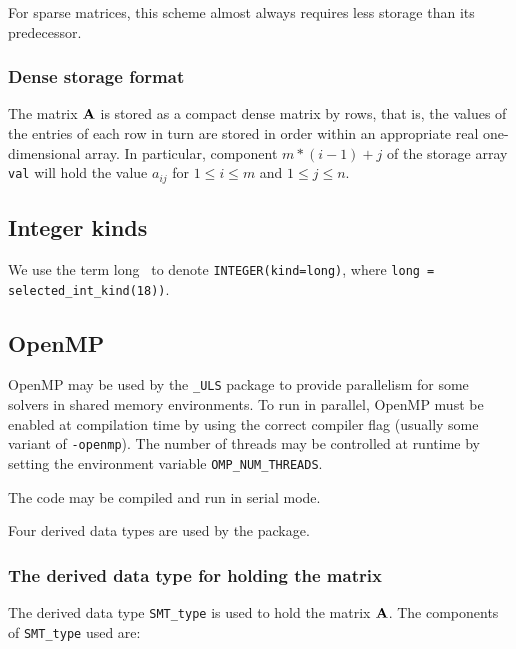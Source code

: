 \documentclass{galahad}
\newcommand{\packagename}{ULS}
\newcommand{\fullpackagename}{\libraryname\_\-\packagename}
\begin{document}
For sparse matrices, this scheme almost always requires less storage than
its predecessor.

\subsubsection{Dense storage format}\label{dense}
The matrix ${\mathbf{A}}$ is stored as a compact
dense matrix by rows, that is, the values of the entries of each row in turn are
stored in order within an appropriate real one-dimensional array.
In particular,
component $m \ast (i-1) + j$ of the storage array {\tt val}
will hold the value $a_{ij}$
for $1 \leq i \leq m$ and $1 \leq j \leq n$.

\subsection{Integer kinds}\label{Integer kinds}
We use the term
long \integer\ to denote {\tt INTEGER\-(kind=long)}, where
{\tt long = selected\_int\_kind(18))}.


\subsection{OpenMP}
OpenMP may be used by the {\tt \fullpackagename} package to provide
parallelism for some solvers in shared memory environments.
To run in parallel, OpenMP
must be enabled at compilation time by using the correct compiler flag
(usually some variant of {\tt -openmp}).
The number of threads may be controlled at runtime
by setting the environment variable {\tt OMP\_NUM\_THREADS}.

\noindent
The code may be compiled and run in serial mode.



\galtypes
Four derived data types are used by the package.


\subsubsection{The derived data type for holding the matrix}\label{typeprob}
The derived data type {\tt SMT\_type} is used to hold the matrix ${\mathbf{A}}$.
The components of {\tt SMT\_type} used are:
\end{document}
